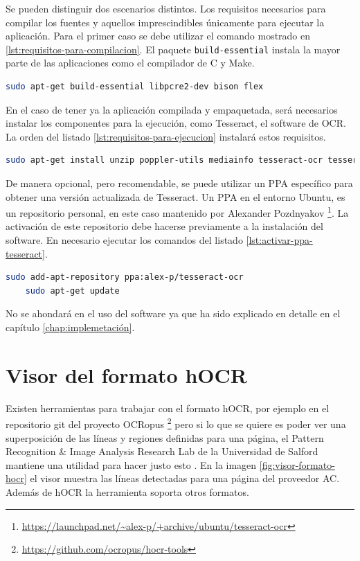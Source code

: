 Se pueden distinguir dos escenarios distintos. Los requisitos necesarios para compilar los fuentes y aquellos imprescindibles únicamente para ejecutar la aplicación. Para el primer caso se debe utilizar el comando mostrado en \ref{lst:requisitos-para-compilacion}. El paquete \verb|build-essential| instala la mayor parte de las aplicaciones como el compilador de C y Make.

\begin{lstlisting}[language=bash,caption={Dependencias para la compilación},label=lst:requisitos-para-compilacion]
    sudo apt-get build-essential libpcre2-dev bison flex
\end{lstlisting}

En el caso de tener ya la aplicación compilada y empaquetada, será necesarios instalar los componentes para la ejecución, como Tesseract, el software de OCR. La orden del listado \ref{lst:requisitos-para-ejecucion} instalará estos requisitos.

\begin{lstlisting}[language=bash,caption={Dependencias para la ejecución},label=lst:requisitos-para-ejecucion]
    sudo apt-get install unzip poppler-utils mediainfo tesseract-ocr tesseract-ocr-spa jq python3-opencv jq bc
\end{lstlisting}

De manera opcional, pero recomendable, se puede utilizar un PPA específico para obtener una versión actualizada de Tesseract. Un PPA en el entorno Ubuntu, es un repositorio personal, en este caso mantenido por Alexander Pozdnyakov \footnote{\url{https://launchpad.net/~alex-p/+archive/ubuntu/tesseract-ocr}}. La activación de este repositorio debe hacerse previamente a la instalación del software. En necesario ejecutar los comandos del listado \ref{lst:activar-ppa-tesseract}.

\begin{lstlisting}[language=bash,caption={Activar PPA de Tesseract},label=lst:activar-ppa-tesseract]
    sudo add-apt-repository ppa:alex-p/tesseract-ocr
    sudo apt-get update
\end{lstlisting}

No se ahondará en el uso del software ya que ha sido explicado en detalle en el capítulo \ref{chap:implemetación}.

\section{Visor del formato hOCR}

Existen herramientas para trabajar con el formato hOCR, por ejemplo en el repositorio git del proyecto OCRopus \footnote{\url{https://github.com/ocropus/hocr-tools}} pero si lo que se quiere es poder ver una superposición de las líneas y regiones definidas para una página, el Pattern Recognition \& Image Analysis Research Lab de la Universidad de Salford mantiene una utilidad para hacer justo esto \cite{prima_tool_page_viewer}. En la imagen \ref{fig:visor-formato-hocr} el visor muestra las líneas detectadas para una página del proveedor AC. Además de hOCR la herramienta soporta otros formatos.

